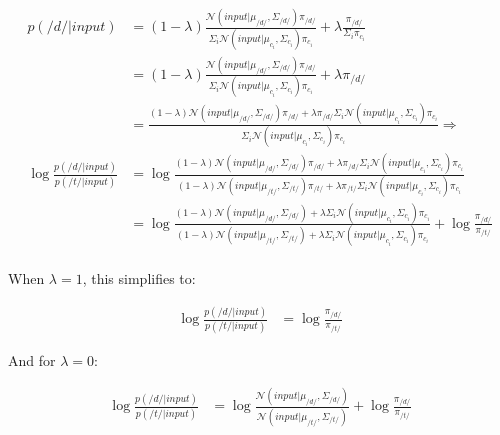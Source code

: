 \documentclass[
  11pt,
  man,floatsintext]{apa6}
\begin{document}
\begin{equation}\label{eq:change-bias}
\begin{split}
p(/d/ | input) & = (1-\lambda) \frac{\mathcal{N}\!\left( input | \mu_{/d/}, \Sigma_{/d/} \right) \pi_{/d/}}{\Sigma_i \mathcal{N}\!\left( input | \mu_{c_i}, \Sigma_{c_i}\right) \pi_{c_i}} + \lambda \frac{\pi_{/d/}}{\Sigma_i \pi_{c_i}} \\
 & = (1-\lambda) \frac{\mathcal{N}\!\left( input | \mu_{/d/}, \Sigma_{/d/} \right) \pi_{/d/}}{\Sigma_i \mathcal{N}\!\left( input | \mu_{c_i}, \Sigma_{c_i}\right) \pi_{c_i}} + \lambda \pi_{/d/} \\
 & = \frac{(1-\lambda) \mathcal{N}\!\left( input | \mu_{/d/}, \Sigma_{/d/} \right) \pi_{/d/} + \lambda \pi_{/d/} \Sigma_i \mathcal{N}\!\left( input | \mu_{c_i}, \Sigma_{c_i}\right) \pi_{c_i}}{\Sigma_i \mathcal{N}\!\left( input | \mu_{c_i}, \Sigma_{c_i}\right) \pi_{c_i}} \Rightarrow \\
\log \frac{p(/d/ | input)}{p(/t/ | input)}  & = \log \frac{(1-\lambda) \mathcal{N}\!\left( input | \mu_{/d/}, \Sigma_{/d/} \right) \pi_{/d/} + \lambda \pi_{/d/} \Sigma_i \mathcal{N}\!\left( input | \mu_{c_i}, \Sigma_{c_i}\right) \pi_{c_i}}{(1-\lambda) \mathcal{N}\!\left( input | \mu_{/t/}, \Sigma_{/t/} \right) \pi_{/t/} + \lambda \pi_{/t/} \Sigma_i \mathcal{N}\!\left( input | \mu_{c_i}, \Sigma_{c_i}\right) \pi_{c_i}} \\
 & = \log \frac{(1-\lambda) \mathcal{N}\!\left( input | \mu_{/d/}, \Sigma_{/d/} \right) + \lambda \Sigma_i \mathcal{N}\!\left( input | \mu_{c_i}, \Sigma_{c_i}\right) \pi_{c_i}}{(1-\lambda) \mathcal{N}\!\left( input | \mu_{/t/}, \Sigma_{/t/} \right)  + \lambda  \Sigma_i \mathcal{N}\!\left( input | \mu_{c_i}, \Sigma_{c_i}\right) \pi_{c_i}} + \log\frac{\pi_{/d/}}{\pi_{/t/}} \\
\end{split}
\end{equation}

When \(\lambda=1\), this simplifies to:

\begin{equation}
\begin{split}
\log \frac{p(/d/ | input)}{p(/t/ | input)} & = \log\frac{\pi_{/d/}}{\pi_{/t/}}
\end{split}
\end{equation}

And for \(\lambda=0\):

\begin{equation}
\begin{split}
\log \frac{p(/d/ | input)}{p(/t/ | input)} & = \log \frac{\mathcal{N}\!\left( input | \mu_{/d/}, \Sigma_{/d/} \right)}{\mathcal{N}\!\left( input | \mu_{/t/}, \Sigma_{/t/} \right)} + \log\frac{\pi_{/d/}}{\pi_{/t/}}
\end{split}
\end{equation}
\end{document}
